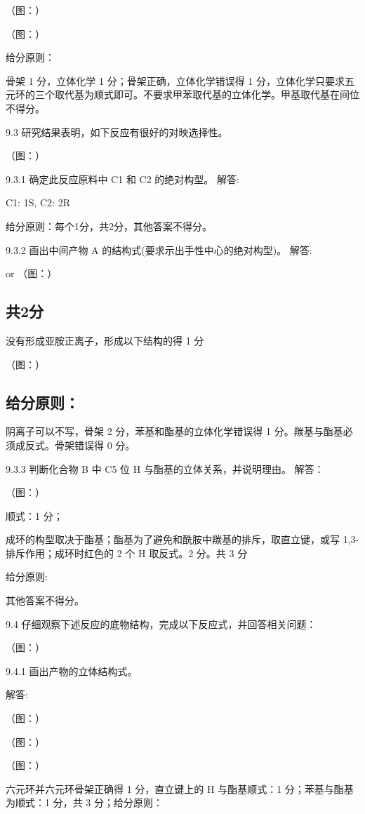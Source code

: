 （图：）

（图：）

给分原则：

骨架 1 分，立体化学 1 分；骨架正确，立体化学错误得 1 分，立体化学只要求五元环的三个取代基为顺式即可。不要求甲苯取代基的立体化学。甲基取代基在间位不得分。

9.3 研究结果表明，如下反应有很好的对映选择性。

（图：）

9.3.1 确定此反应原料中 C1 和 C2 的绝对构型。
解答:

C1: 1S, C2: 2R

给分原则：每个1分，共2分，其他答案不得分。

9.3.2 画出中间产物 A 的结构式(要求示出手性中心的绝对构型)。
解答:

or
（图：）

\subsection*{共2分}

没有形成亚胺正离子，形成以下结构的得 1 分

（图：）

\subsection*{给分原则：}

阴离子可以不写，骨架 2 分，苯基和酯基的立体化学错误得 1 分。羰基与酯基必须成反式。骨架错误得 0 分。

9.3.3 判断化合物 B 中 C5 位 H 与酯基的立体关系，并说明理由。
解答：

（图：）

顺式：1 分；

成环的构型取决于酯基；酯基为了避免和酰胺中羰基的排斥，取直立键，或写 1,3-排斥作用；成环时红色的 2 个 H 取反式。2 分。共 3 分

给分原则:

其他答案不得分。

9.4 仔细观察下述反应的底物结构，完成以下反应式，并回答相关问题：

（图：）

9.4.1 画出产物的立体结构式。

解答:

（图：）

（图：）

（图：）

六元环并六元环骨架正确得 1 分，直立键上的 H 与酯基顺式：1 分；苯基与酯基为顺式：1 分，共 3 分；给分原则：

